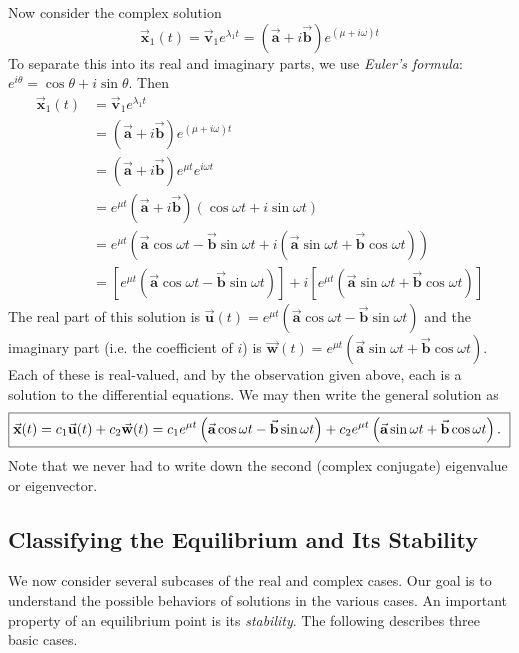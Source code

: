 \documentclass{book}
\newcommand{\BA}{\vec{\textbf{a}}}
\newcommand{\BB}{\vec{\textbf{b}}}
\newcommand{\BU}{\vec{\textbf{u}}}
\newcommand{\BV}{\vec{\textbf{v}}}
\newcommand{\BW}{\vec{\textbf{w}}}
\newcommand{\BX}{\vec{\textbf{x}}}
\begin{document}
Now consider the complex solution
\begin{equation}
  \BX_1(t) = \BV_1 e^{\lambda_1 t}
    = (\BA+i\BB) e^{(\mu + i\omega)t}
\end{equation}
To separate this into its real and imaginary parts, we use
\emph{Euler's formula}:
$e^{i\theta} = \cos\theta + i \sin\theta$.
Then
\begin{equation}
\begin{split}
  \BX_1(t) & = \BV_1 e^{\lambda_1 t} \\
     & = (\BA+i\BB) e^{(\mu + i\omega)t} \\
     & = (\BA+i\BB)e^{\mu t} e^{i\omega t} \\
     & = e^{\mu t} (\BA+i\BB)(\cos \omega t + i\sin \omega t) \\
     & = e^{\mu t} \left(\BA\cos\omega t - \BB\sin\omega t + i(\BA\sin\omega t + \BB\cos\omega t)\right) \\
     & = \left[e^{\mu t}\left(\BA\cos\omega t - \BB\sin\omega t \right) \right]
         + i \left[e^{\mu t}\left(\BA\sin\omega t + \BB\cos\omega t\right) \right]
\end{split} 
\end{equation}
The real part of this solution is 
$\BU(t) = e^{\mu t}\left(\BA\cos\omega t - \BB\sin\omega t \right)$
and the imaginary part (i.e. the coefficient of $i$) is
$\BW(t) = e^{\mu t}\left(\BA\sin\omega t + \BB\cos\omega t\right)$.
Each of these is real-valued, and by the observation given
above, each is a solution to the differential equations.
We may then write the general solution as
\begin{equation}
\textrm{\framebox{%
  $\displaystyle \BX(t) = c_1 \BU(t) + c_2 \BW(t)
     = c_1 e^{\mu t}\left(\BA\cos\omega t - \BB\sin\omega t \right)
         + c_2 e^{\mu t}\left(\BA\sin\omega t + \BB\cos\omega t\right).$
}}
\label{eqn:gensolcomplex}
\end{equation}
Note that we never had to write down the second (complex conjugate)
eigenvalue or eigenvector. 

\subsection*{Classifying the Equilibrium and Its Stability}
We now consider several subcases of the real and complex cases.
Our goal is to understand the possible behaviors of solutions
in the various cases.
An important property of an equilibrium point is its
\emph{stability}.
The following describes three basic cases.
\end{document}
